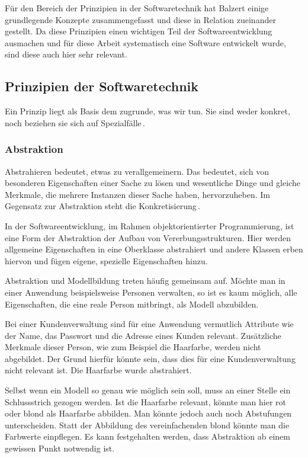 \documentclass[12pt,oneside,a4paper,parskip]{scrbook}
\begin{document}
Für den Bereich der Prinzipien in der Softwaretechnik hat Balzert einige grundlegende Konzepte zusammengefasst und diese in Relation zueinander gestellt. Da diese Prinzipien einen wichtigen Teil der Softwareentwicklung ausmachen und für diese Arbeit systematisch eine Software entwickelt wurde, sind diese auch hier sehr relevant.

\subsection{Prinzipien der Softwaretechnik}

Ein Prinzip liegt als Basis dem zugrunde, was wir tun. Sie sind weder konkret, noch beziehen sie sich auf Spezialfälle\,\cite[S.\,25]{balzert2009a}.

\subsubsection{Abstraktion}

Abstrahieren bedeutet, etwas zu verallgemeinern. Das bedeutet, sich von besonderen Eigenschaften einer Sache zu lösen und wesentliche Dinge und gleiche Merkmale, die mehrere Instanzen dieser Sache haben, hervorzuheben. Im Gegensatz zur Abstraktion steht die Konkretisierung\,\cite[S.\,26]{balzert2009a}.

In der Softwareentwicklung, im Rahmen objektorientierter Programmierung, ist eine Form der Abstraktion der Aufbau von Vererbungsstrukturen. Hier werden allgemeine Eigenschaften in eine Oberklasse abstrahiert und andere Klassen erben hiervon und fügen eigene, spezielle Eigenschaften hinzu.

Abstraktion und Modellbildung treten häufig gemeinsam auf. Möchte man in einer Anwendung beispielsweise Personen verwalten, so ist es kaum möglich, alle Eigenschaften, die eine reale Person mitbringt, als Modell abzubilden.

Bei einer Kundenverwaltung sind für eine Anwendung vermutlich Attribute wie der Name, das Passwort und die Adresse eines Kunden relevant. Zusätzliche Merkmale dieser Person, wie zum Beispiel die Haarfarbe, werden nicht abgebildet. Der Grund hierfür könnte sein, dass dies für eine Kundenverwaltung nicht relevant ist. Die Haarfarbe wurde abstrahiert.

Selbst wenn ein Modell so genau wie möglich sein soll, muss an einer Stelle ein Schlussstrich gezogen werden. Ist die Haarfarbe relevant, könnte man hier rot oder blond als Haarfarbe abbilden. Man könnte jedoch auch noch Abstufungen unterscheiden. Statt der Abbildung des vereinfachenden blond könnte man die Farbwerte einpflegen. Es kann festgehalten werden, dass Abstraktion ab einem gewissen Punkt notwendig ist.
\end{document}
